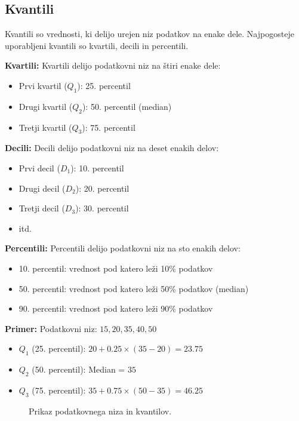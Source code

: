 \subsection{Kvantili}

Kvantili so vrednosti, ki delijo urejen niz podatkov na enake dele. Najpogosteje uporabljeni kvantili so kvartili, decili in percentili.

\textbf{Kvartili:}
Kvartili delijo podatkovni niz na štiri enake dele:
\begin{itemize}
    \item Prvi kvartil ($Q_1$): 25. percentil
    \item Drugi kvartil ($Q_2$): 50. percentil (median)
    \item Tretji kvartil ($Q_3$): 75. percentil
\end{itemize}

\textbf{Decili:}
Decili delijo podatkovni niz na deset enakih delov:
\begin{itemize}
    \item Prvi decil ($D_1$): 10. percentil
    \item Drugi decil ($D_2$): 20. percentil
    \item Tretji decil ($D_3$): 30. percentil
    \item itd.
\end{itemize}

\textbf{Percentili:}
Percentili delijo podatkovni niz na sto enakih delov:
\begin{itemize}
    \item 10. percentil: vrednost pod katero leži 10\% podatkov
    \item 50. percentil: vrednost pod katero leži 50\% podatkov (median)
    \item 90. percentil: vrednost pod katero leži 90\% podatkov
\end{itemize}

\textbf{Primer:}
Podatkovni niz: $15, 20, 35, 40, 50$
\begin{itemize}
    \item $Q_1$ (25. percentil): $20 + 0.25 \times (35 - 20) = 23.75$
    \item $Q_2$ (50. percentil): Median = $35$
    \item $Q_3$ (75. percentil): $35 + 0.75 \times (50 - 35) = 46.25$
\end{itemize}

\begin{figure}
\centering
{}
\caption{Prikaz podatkovnega niza in kvantilov.}
\end{figure}

